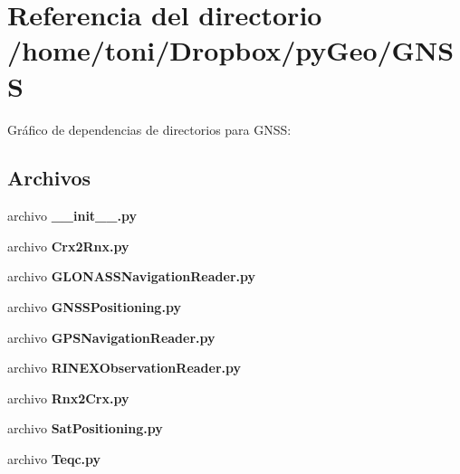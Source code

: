 \section{Referencia del directorio /home/toni/\-Dropbox/py\-Geo/\-G\-N\-S\-S}
\label{dir_93e5dd9a129be22924825f99105cff8f}
Gráfico de dependencias de directorios para G\-N\-S\-S\-:
\subsection*{Archivos}
\begin{DoxyCompactItemize}
\item 
archivo {\bf \-\_\-\-\_\-init\-\_\-\-\_\-.\-py}
\item 
archivo {\bf Crx2\-Rnx.\-py}
\item 
archivo {\bf G\-L\-O\-N\-A\-S\-S\-Navigation\-Reader.\-py}
\item 
archivo {\bf G\-N\-S\-S\-Positioning.\-py}
\item 
archivo {\bf G\-P\-S\-Navigation\-Reader.\-py}
\item 
archivo {\bf R\-I\-N\-E\-X\-Observation\-Reader.\-py}
\item 
archivo {\bf Rnx2\-Crx.\-py}
\item 
archivo {\bf Sat\-Positioning.\-py}
\item 
archivo {\bf Teqc.\-py}
\end{DoxyCompactItemize}

